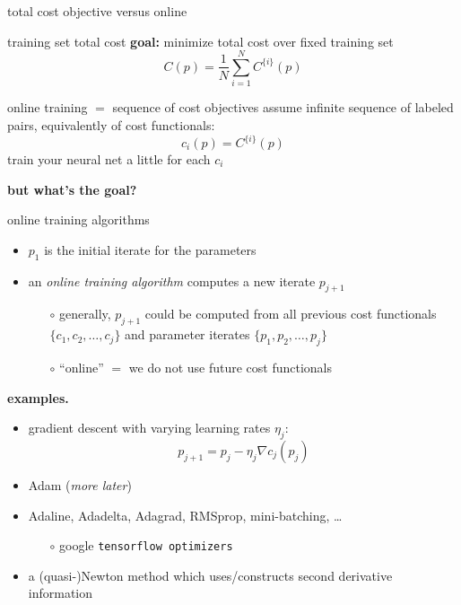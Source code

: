 \documentclass[xcolor={svgnames},
               hyperref={colorlinks,citecolor=DeepPink4,linkcolor=FireBrick,urlcolor=Maroon}]
               {beamer}
\newcommand{\grad}{\nabla}
\begin{document}
\begin{frame}{total cost objective versus online}

\begin{block}{training set total cost}
\textbf{goal:}  minimize total cost over fixed training set
    $$C(p) = \frac{1}{N} \sum_{i=1}^N C^{\{i\}}(p)$$
\end{block}

\begin{block}{online training $=$ sequence of cost objectives}
assume infinite sequence of labeled pairs, equivalently of cost functionals:
    $$c_i(p) = C^{\{i\}}(p)$$
train your neural net a little for each $c_i$

\textbf{but what's the goal?}
\end{block}
\end{frame}


\begin{frame}{online training algorithms}

\begin{itemize}
\item $p_1$ is the initial iterate for the parameters
\item an \emph{online training algorithm} computes a new iterate $p_{j+1}$
    \begin{itemize}
    \item[$\circ$] generally, $p_{j+1}$ could be computed from all previous cost functionals $\{c_1,c_2,\dots,c_j\}$ and parameter iterates $\{p_1,p_2,\dots,p_j\}$
    \item[$\circ$] ``online'' $=$ we do not use future cost functionals
    \end{itemize}
\end{itemize}

\bigskip
\textbf{examples.}
\begin{itemize}
\item gradient descent with varying learning rates $\eta_j$:
   $$p_{j+1} = p_j - \eta_j \grad c_j(p_j)$$
\item Adam (\emph{more later})
\item Adaline, Adadelta, Adagrad, RMSprop, mini-batching, \dots
    \begin{itemize}
    \item[$\circ$] google \quad \texttt{tensorflow optimizers}
    \end{itemize}
\item a (quasi-)Newton method which uses/constructs second derivative information
\end{itemize}
\end{frame}
\end{document}

